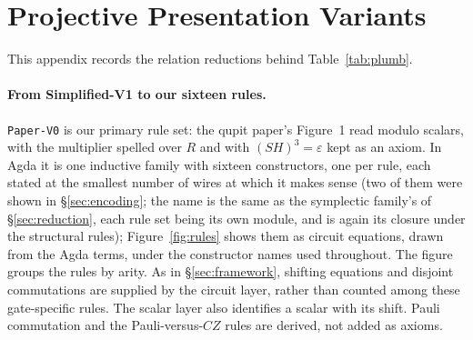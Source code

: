 \section{Projective Presentation Variants}\label{sec:presentation-details}

This appendix records the relation reductions behind Table~\ref{tab:plumb}.

\paragraph{From Simplified-V1 to our sixteen rules.}
\texttt{Paper-V0} is our primary rule set: the qupit paper's Figure~1
read modulo scalars, with the multiplier spelled over $R$ and with
$(SH)^3 = \varepsilon$ kept as an axiom.  In Agda it is one inductive
family  with sixteen constructors, one per rule,
each stated at the smallest number of wires at which it makes sense
(two of them were shown in \S\ref{sec:encoding}; the name is the same
as the symplectic family's of \S\ref{sec:reduction}, each rule set
being its own module, and  is again its
closure under the structural rules);
Figure~\ref{fig:rules} shows them as circuit equations, drawn from the
Agda terms, under the constructor names used throughout.  The figure groups the rules by arity.  As in \S\ref{sec:framework},
shifting equations and disjoint commutations are supplied by the circuit
layer, rather than counted among these gate-specific rules.  The scalar
layer also identifies a scalar with its shift.  Pauli commutation and
the Pauli-versus-$CZ$ rules are derived, not added as axioms.

